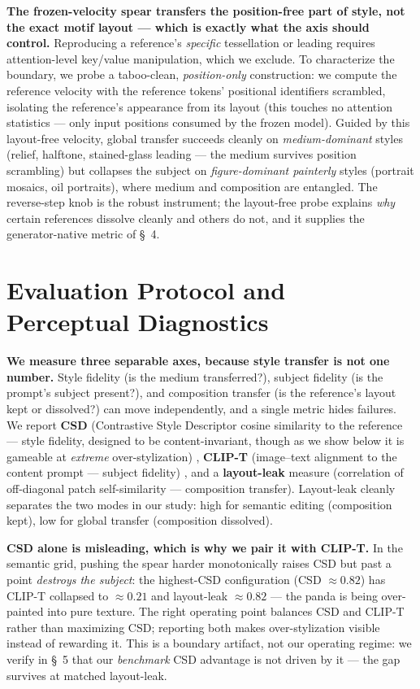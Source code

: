 \documentclass[letterpaper]{article} %
\begin{document}
\textbf{The frozen-velocity spear transfers the position-free part of style,
not the exact motif layout --- which is exactly what the axis should
control.} Reproducing a reference's \emph{specific} tessellation or leading
requires attention-level key/value manipulation, which we exclude. To
characterize the boundary, we probe a taboo-clean, \emph{position-only}
construction: we compute the reference velocity with the reference tokens'
positional identifiers scrambled, isolating the reference's appearance from
its layout (this touches no attention statistics --- only input positions
consumed by the frozen model). Guided by this layout-free velocity, global
transfer succeeds cleanly on \emph{medium-dominant} styles (relief, halftone,
stained-glass leading --- the medium survives position scrambling) but
collapses the subject on \emph{figure-dominant painterly} styles (portrait
mosaics, oil portraits), where medium and composition are entangled. The
reverse-step knob is the robust instrument; the layout-free probe explains
\emph{why} certain references dissolve cleanly and others do not, and it
supplies the generator-native metric of \S~4.

\section{Evaluation Protocol and Perceptual Diagnostics}

\textbf{We measure three separable axes, because style transfer is not one
number.} Style fidelity (is the medium transferred?), subject fidelity (is
the prompt's subject present?), and composition transfer (is the reference's
layout kept or dissolved?) can move independently, and a single metric hides
failures. We report \textbf{CSD} (Contrastive Style Descriptor cosine
similarity to the reference --- style fidelity, designed to be
content-invariant, though as we show below it is gameable at \emph{extreme}
over-stylization) \citep{somepalli2024csd}, \textbf{CLIP-T} (image--text
alignment to the content prompt --- subject fidelity) \citep{radford2021clip},
and a \textbf{layout-leak} measure (correlation of off-diagonal patch
self-similarity --- composition transfer). Layout-leak cleanly separates the
two modes in our study: high for semantic editing (composition kept), low for
global transfer (composition dissolved).

\textbf{CSD alone is misleading, which is why we pair it with CLIP-T.} In the
semantic grid, pushing the spear harder monotonically raises CSD but past a
point \emph{destroys the subject}: the highest-CSD configuration (CSD
$\approx 0.82$) has CLIP-T collapsed to $\approx 0.21$ and layout-leak
$\approx 0.82$ --- the panda is being over-painted into pure texture. The
right operating point balances CSD and CLIP-T rather than maximizing CSD;
reporting both makes over-stylization visible instead of rewarding it. This is
a boundary artifact, not our operating regime: we verify in \S~5 that our
\emph{benchmark} CSD advantage is not driven by it --- the gap survives at
matched layout-leak.
\end{document}
